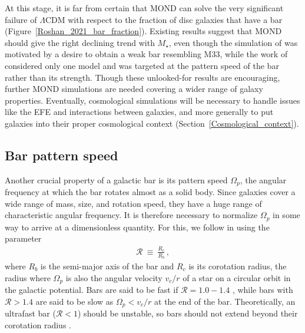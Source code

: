 \documentclass[fleqn,usenatbib,useAMS,onecolumn]{mnras} %
\begin{document}
At this stage, it is far from certain that MOND can solve the very significant failure of $\Lambda$CDM with respect to the fraction of disc galaxies that have a bar (Figure~\ref{Roshan_2021_bar_fraction}). Existing results suggest that MOND should give the right declining trend with $M_{\star}$, even though the simulation of \citet{Banik_2020_M33} was motivated by a desire to obtain a weak bar resembling M33, while the work of \citet{Roshan_2021_disc_stability} considered only one model and was targeted at the pattern speed of the bar rather than its strength. Though these unlooked-for results are encouraging, further MOND simulations are needed covering a wider range of galaxy properties. Eventually, cosmological simulations will be necessary to handle issues like the EFE and interactions between galaxies, and more generally to put galaxies into their proper cosmological context (Section~\ref{Cosmological_context}).



\subsection{Bar pattern speed}
\label{Bar_pattern_speed}

Another crucial property of a galactic bar is its pattern speed $\Omega_p$, the angular frequency at which the bar rotates almost as a solid body. Since galaxies cover a wide range of mass, size, and rotation speed, they have a huge range of characteristic angular frequency. It is therefore necessary to normalize $\Omega_p$ in some way to arrive at a dimensionless quantity. For this, we follow \citet{Elmegreen_1996} in using the parameter
\begin{eqnarray}
	\mathcal{R} ~\equiv~ \frac{R_c}{R_b} \, ,
	\label{R_def}
\end{eqnarray}
where $R_b$ is the semi-major axis of the bar and $R_c$ is its corotation radius, the radius where $\Omega_p$ is also the angular velocity $v_c/r$ of a star on a circular orbit in the galactic potential. Bars are said to be fast if $\mathcal{R} = 1.0-1.4$ \citep{Galactic_Dynamics}, while bars with $\mathcal{R} > 1.4$ are said to be slow as $\Omega_p < v_c/r$ at the end of the bar. Theoretically, an ultrafast bar ($\mathcal{R} < 1$) should be unstable, so bars should not extend beyond their corotation radius \citep{Contopoulos_1980, Contopoulos_1981, Contopoulos_1989}.
\end{document}
